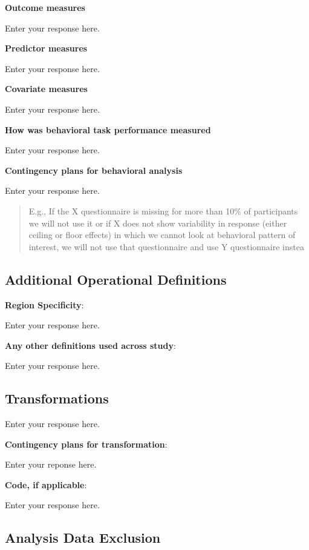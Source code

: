\documentclass[]{article}
\newcounter{question}
\begin{document}
\textbf{Outcome measures}

Enter your response here.

\textbf{Predictor measures}

Enter your response here.

\textbf{Covariate measures}

Enter your response here.

\textbf{How was behavioral task performance measured}

Enter your response here.

\textbf{Contingency plans for behavioral analysis}

Enter your response here.

\begin{quote}
E.g., If the X questionnaire is missing for more than 10\% of
participants we will not use it or if X does not show variability in
response (either ceiling or floor effects) in which we cannot look at
behavioral pattern of interest, we will not use that questionnaire and
use Y questionnaire instea
\end{quote}

\hypertarget{additional-operational-definitions}{%
\subsection{Additional Operational
Definitions}\label{additional-operational-definitions}}

\textbf{Region Specificity}:

Enter your response here.

\textbf{Any other definitions used across study}:

Enter your response here.

\hypertarget{transformations}{%
\subsection{Transformations}\label{transformations}}

Enter your response here.

\textbf{Contingency plans for transformation}:

Enter your reponse here.

\textbf{Code, if applicable}:

Enter your response here.

\hypertarget{analysis-data-exclusion}{%
\subsection{Analysis Data Exclusion}\label{analysis-data-exclusion}}
\end{document}
